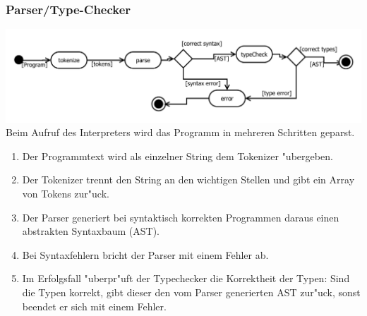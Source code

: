 \documentclass[10pt,a4paper,titlepage]{article}
\begin{document}
\subsubsection{Parser/Type-Checker}
\includegraphics[scale=0.8]{images/AktivitaetParser.pdf}\newline
Beim Aufruf des Interpreters wird das Programm in mehreren Schritten geparst.
\begin{enumerate}
\item Der Programmtext wird als einzelner String dem Tokenizer "ubergeben.
\item Der Tokenizer trennt den String an den wichtigen Stellen und gibt ein Array von Tokens zur"uck.
\item Der Parser generiert bei syntaktisch korrekten Programmen daraus einen abstrakten Syntaxbaum (AST).
\item Bei Syntaxfehlern bricht der Parser mit einem Fehler ab.
\item Im Erfolgsfall "uberpr"uft der Typechecker die Korrektheit der Typen: Sind die Typen korrekt, gibt dieser den vom Parser generierten AST zur"uck, sonst beendet er sich mit einem Fehler.
\end{enumerate}
\end{document}
